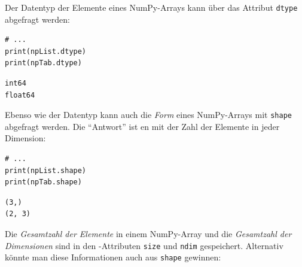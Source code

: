 Der Datentyp der Elemente eines NumPy-Arrays kann über das Attribut \texttt{dtype} abgefragt werden:
\begin{tcbraster}[raster columns=2,
                  raster equal height,
                  nobeforeafter,
                  raster column skip=0.5cm]
\begin{codebox}
\begin{verbatim}
# ...
print(npList.dtype)
print(npTab.dtype)
\end{verbatim}
\end{codebox}
%
\begin{cmdbox}
\begin{verbatim}
int64
float64
\end{verbatim}
\end{cmdbox}
\end{tcbraster}

Ebenso wie der Datentyp kann auch die \emph{Form} eines NumPy-Arrays mit \texttt{shape} abgefragt werden. Die \enquote{Antwort} ist en  mit der Zahl der Elemente in jeder Dimension:

\begin{tcbraster}[raster columns=2,
                  raster equal height,
                  nobeforeafter,
                  raster column skip=0.5cm]
\begin{codebox}
\begin{verbatim}
# ...
print(npList.shape)
print(npTab.shape)
\end{verbatim}
\end{codebox}
%
\begin{cmdbox}
\begin{verbatim}
(3,)
(2, 3)
\end{verbatim}
\end{cmdbox}
\end{tcbraster}

Die \emph{Gesamtzahl der Elemente} in einem NumPy-Array und die \emph{Gesamtzahl der Dimensionen} sind in den -Attributen \texttt{size} und \texttt{ndim} gespeichert. Alternativ könnte man diese Informationen auch aus \texttt{shape} gewinnen:

